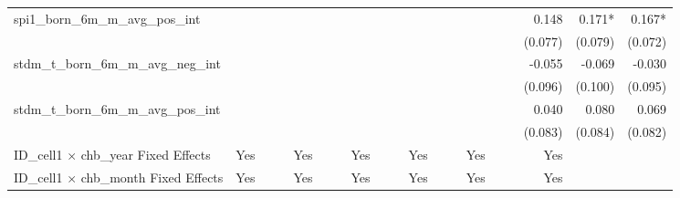 \begin{tabular}{lrrrrrrrrrrrrrrrrrr}
spi1\_born\_6m\_m\_avg\_pos\_int            &             &             &             &             &             &             &             &             &             &             &             &             &             &             &             &       0.148 &      0.171* &      0.167* \\ 
                                            &             &             &             &             &             &             &             &             &             &             &             &             &             &             &             &     (0.077) &     (0.079) &     (0.072) \\ 
stdm\_t\_born\_6m\_m\_avg\_neg\_int         &             &             &             &             &             &             &             &             &             &             &             &             &             &             &             &      -0.055 &      -0.069 &      -0.030 \\ 
                                            &             &             &             &             &             &             &             &             &             &             &             &             &             &             &             &     (0.096) &     (0.100) &     (0.095) \\ 
stdm\_t\_born\_6m\_m\_avg\_pos\_int         &             &             &             &             &             &             &             &             &             &             &             &             &             &             &             &       0.040 &       0.080 &       0.069 \\ 
                                            &             &             &             &             &             &             &             &             &             &             &             &             &             &             &             &     (0.083) &     (0.084) &     (0.082) \\ 
\midrule
ID\_cell1 $\times$ chb\_year Fixed Effects  &         Yes &             &             &         Yes &             &             &         Yes &             &             &         Yes &             &             &         Yes &             &             &         Yes &             &             \\ 
ID\_cell1 $\times$ chb\_month Fixed Effects &         Yes &             &             &         Yes &             &             &         Yes &             &             &         Yes &             &             &         Yes &             &             &         Yes &             &             \\ 

\end{tabular}
